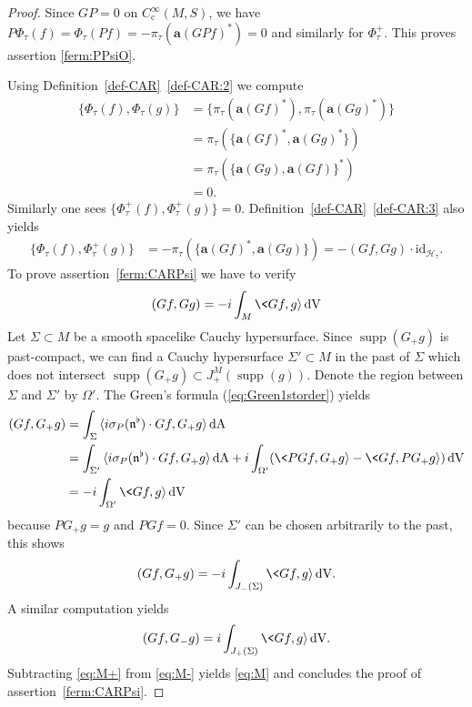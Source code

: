 \documentclass[a4paper,11pt]{amsart}
\theoremstyle{definition}
\begin{document}
\begin{proof}
Since $GP=0$ on ${C^\infty_\mathrm{c}}(M,S)$, we have $P\Phi_\tau(f) = \Phi_\tau(Pf) = -\pi_\tau({\mathbf{a}}(GPf)^*) = 0$ and similarly for $\Phi_\tau^+$.
This proves assertion \eqref{ferm:PPsiO}.

Using Definition~\ref{def-CAR}~\eqref{def-CAR:2} we compute
\begin{align*}
 \{\Phi_\tau(f),\Phi_\tau(g)\}
&=\{\pi_\tau({\mathbf{a}}(Gf)^*),\pi_\tau({\mathbf{a}}(Gg)^*)\}\\
&=\pi_\tau(\{{\mathbf{a}}(Gf)^*,{\mathbf{a}}(Gg)^*\})\\
&=\pi_\tau(\{{\mathbf{a}}(Gg),{\mathbf{a}}(Gf)\}^*)\\
&=0.
\end{align*}
Similarly one sees $\{\Phi_\tau^+(f),\Phi_\tau^+(g)\}=0$.
Definition~\ref{def-CAR}~\eqref{def-CAR:3} also yields
\begin{align*}
 \{\Phi_\tau(f),\Phi_\tau^+(g)\}
&=-\pi_\tau(\{{\mathbf{a}}(Gf)^*,{\mathbf{a}}(Gg)\})
=-(Gf,Gg)\cdot{\mathrm{id}}_{{\mathcal{H}}_\tau}.
\end{align*}
To prove assertion~\eqref{ferm:CARPsi} we have to verify
\begin{equation}
(Gf,Gg) = -i\int_{M}\<Gf,g{\rangle}{\,\mathrm{dV}}
\label{eq:M}
\end{equation}
Let $\Sigma\subset M$ be a smooth spacelike Cauchy hypersurface.
Since ${\operatorname{supp}}(G_+g)$ is past-compact, we can find a Cauchy hypersurface $\Sigma'\subset M$ in the past of $\Sigma$ which does not intersect ${\operatorname{supp}}(G_+g)\subset J^M_+({\operatorname{supp}}(g))$.
Denote the region between $\Sigma$ and $\Sigma'$ by $\Omega'$.
The Green's formula (\ref{eq:Green1storder}) yields
\begin{align*}
(Gf,G_+g)
&=
\int_\Sigma {\langle} i\sigma_P(\mathfrak{n}^\flat)\cdot Gf,G_+g{\rangle}{\,\mathrm{dA}} \nonumber\\
&=
\int_{\Sigma'} {\langle} i\sigma_P(\mathfrak{n}^\flat)\cdot Gf,G_+g{\rangle}{\,\mathrm{dA}} 
+ i\int_{\Omega'}(\<PGf,G_+g{\rangle}-\<Gf,PG_+g{\rangle}){\,\mathrm{dV}}\nonumber\\
&=
-i\int_{\Omega'}\<Gf,g{\rangle}{\,\mathrm{dV}}
\end{align*}
because $PG_+g=g$ and $PGf=0$.
Since $\Sigma'$ can be chosen arbitrarily to the past, this shows
\begin{equation}
(Gf,G_+g) = -i\int_{J_-(\Sigma)}\<Gf,g{\rangle}{\,\mathrm{dV}}.
\label{eq:M-}
\end{equation}
A similar computation yields
\begin{equation}
(Gf,G_-g) = i\int_{J_+(\Sigma)}\<Gf,g{\rangle}{\,\mathrm{dV}}.
\label{eq:M+}
\end{equation}
Subtracting \eqref{eq:M+} from \eqref{eq:M-} yields \eqref{eq:M} and concludes the proof of assertion~\eqref{ferm:CARPsi}.
\end{proof}
\end{document}
